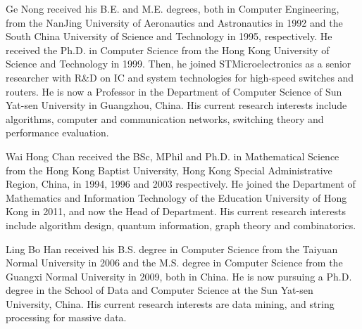 \documentclass[10pt,journal,compsoc]{IEEEtran}
\begin{document}
\begin{IEEEbiography}{Ge Nong}
received his B.E. and M.E. degrees, both in Computer Engineering, from the NanJing University of Aeronautics and Astronautics in 1992 and the South China University of Science and Technology in 1995, respectively. He received the Ph.D. in Computer Science from the Hong Kong University of Science and Technology in 1999. Then, he joined STMicroelectronics as a senior researcher with R\&D on IC and system technologies for high-speed switches and routers. He is now a Professor in the Department of Computer Science of Sun Yat-sen University in Guangzhou, China. His current research interests include algorithms, computer and communication networks, switching theory and performance evaluation.
\end{IEEEbiography}

\begin{IEEEbiography}{Wai Hong Chan}
received the BSc, MPhil and Ph.D. in Mathematical Science from the Hong Kong Baptist University, Hong Kong Special Administrative Region, China, in 1994, 1996 and 2003 respectively. He joined the Department of Mathematics and Information Technology of the Education University of Hong Kong in 2011, and now the Head of Department. His current research interests include algorithm design, quantum information, graph theory and combinatorics.
\end{IEEEbiography}

\begin{IEEEbiography}{Ling Bo Han}
received his B.S. degree in Computer Science from the Taiyuan Normal University in 2006 and the M.S. degree in Computer Science from the Guangxi Normal University in 2009, both in China. He is now pursuing a Ph.D. degree in the School of Data and Computer Science at the Sun Yat-sen University, China. His current research interests are data mining, and string processing for massive data.
\end{IEEEbiography}
\end{document}
